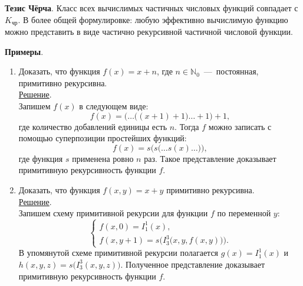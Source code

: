 \textbf{Тезис Чёрча}. Класс всех вычислимых частичных числовых функций совпадает с $K_{\text{чр}}$. В более общей формулировке: любую эффективно вычислимую функцию можно представить в виде частично рекурсивной частичной числовой функции.

\textbf{Примеры}.
\begin{enumerate}
    \item Доказать, что функция $f(x) = x + n$, где $n \in \mathbb{N}_0$~---~постоянная, примитивно рекурсивна. \\
    \underline{Решение}. \\
    Запишем $f(x)$ в следующем виде:
    \[
        f(x) = \Big(\dots\big((x + 1) + 1\big) \dots + 1\Big) + 1,
    \]
    где количество добавлений единицы есть $n$. Тогда $f$ можно записать с помощью суперпозиции простейших функций:
    \[
        f(x) = s\Big(s\big(\dots s(x) \dots\big)\Big),
    \]
    где функция $s$ применена ровно $n$ раз. Такое представление доказывает примитивную рекурсивность функции $f$.
    \item Доказать, что функция $f(x, y) = x + y$ примитивно рекурсивна. \\
    \underline{Решение}. \\
    Запишем схему примитивной рекурсии для функции $f$ по переменной $y$:
    \[
        \begin{cases}
            f(x, 0) = I_1^1(x), \\
            f(x, y + 1) = s\Big(I_3^3\big(x, y, f(x, y)\big)\Big).
        \end{cases}
    \]
    В упомянутой схеме примитивной рекурсии полагается $g(x) = I_1^1(x)$ и $h(x, y, z) = s\big(I_3^3(x, y, z)\big)$. Полученное представление доказывает примитивную рекурсивность функции $f$.
\end{enumerate}